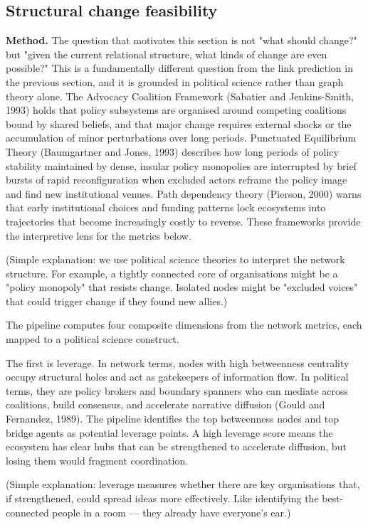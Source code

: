 \documentclass[11pt,a4paper]{article}
\begin{document}
\subsection{Structural change feasibility}

\textbf{Method.} The question that motivates this section is not "what should
change?" but "given the current relational structure, what kinds of
change are even possible?" This is a fundamentally different question
from the link prediction in the previous section, and it is grounded in
political science rather than graph theory alone. The Advocacy Coalition
Framework (Sabatier and Jenkins-Smith, 1993) holds that policy
subsystems are organised around competing coalitions bound by shared
beliefs, and that major change requires external shocks or the
accumulation of minor perturbations over long periods. Punctuated
Equilibrium Theory (Baumgartner and Jones, 1993) describes how long
periods of policy stability maintained by dense, insular policy
monopolies are interrupted by brief bursts of rapid reconfiguration when
excluded actors reframe the policy image and find new institutional
venues. Path dependency theory (Pierson, 2000) warns that early
institutional choices and funding patterns lock ecosystems into
trajectories that become increasingly costly to reverse. These
frameworks provide the interpretive lens for the metrics below.

(Simple explanation: we use political science theories to interpret the
network structure. For example, a tightly connected core of organisations
might be a "policy monopoly" that resists change. Isolated nodes might be
"excluded voices" that could trigger change if they found new allies.)

The pipeline computes four composite dimensions from the network
metrics, each mapped to a political science construct.

The first is leverage. In network terms, nodes with high betweenness
centrality occupy structural holes and act as gatekeepers of information
flow. In political terms, they are policy brokers and boundary spanners
who can mediate across coalitions, build consensus, and accelerate
narrative diffusion (Gould and Fernandez, 1989). The pipeline identifies
the top betweenness nodes and top bridge agents as potential leverage
points. A high leverage score means the ecosystem has clear hubs that
can be strengthened to accelerate diffusion, but losing them would
fragment coordination.

(Simple explanation: leverage measures whether there are key
organisations that, if strengthened, could spread ideas more effectively.
Like identifying the best-connected people in a room — they already have
everyone's ear.)
\end{document}
